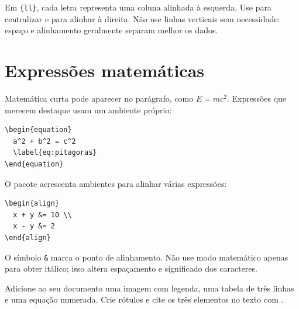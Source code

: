 Em \verb|{ll}|, cada letra representa uma coluna alinhada à esquerda. Use
 para centralizar e  para alinhar à direita. Não use linhas
verticais sem necessidade: espaço e alinhamento geralmente separam melhor os
dados.

\section{Expressões matemáticas}

Matemática curta pode aparecer no parágrafo, como $E=mc^2$. Expressões que
merecem destaque usam um ambiente próprio:

\begin{lstlisting}[language=LaTeXBook]
\begin{equation}
  a^2 + b^2 = c^2
  \label{eq:pitagoras}
\end{equation}
\end{lstlisting}

O pacote  acrescenta ambientes para alinhar várias expressões:

\begin{lstlisting}[language=LaTeXBook]
\begin{align}
  x + y &= 10 \\
  x - y &= 2
\end{align}
\end{lstlisting}

O símbolo \verb|&| marca o ponto de alinhamento. Não use modo matemático apenas
para obter itálico; isso altera espaçamento e significado dos caracteres.

\begin{pratica}
  Adicione ao seu documento uma imagem com legenda, uma tabela de três linhas e
  uma equação numerada. Crie rótulos e cite os três elementos no texto com
  .
\end{pratica}

